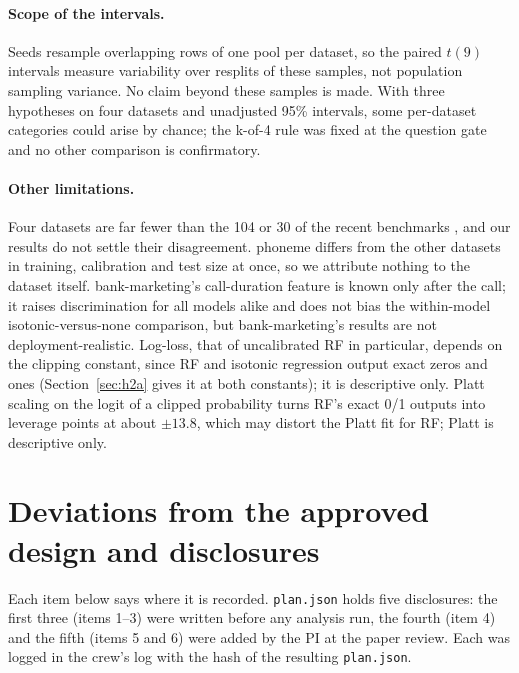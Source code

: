 \documentclass[11pt]{article}
\newcommand{\ds}[1]{\textsf{#1}}
\newcommand{\bm}{\ds{bank-marketing}}
\newcommand{\ph}{\ds{phoneme}}
\begin{document}
\paragraph{Scope of the intervals.} Seeds resample overlapping rows of one pool per dataset,
so the paired $t(9)$ intervals measure variability over resplits of these samples, not
population sampling variance. No claim beyond these samples is made. With three hypotheses
on four datasets and unadjusted 95\% intervals, some per-dataset categories could arise by
chance; the k-of-4 rule was fixed at the question gate and no other comparison is
confirmatory.

\paragraph{Other limitations.} Four datasets are far fewer than the 104 or 30 of the recent
benchmarks \citep{berta2026,manokhin2026}, and our results do not settle their disagreement.
\ph{} differs from the other datasets in training, calibration and test size at once, so we
attribute nothing to the dataset itself. \bm's call-duration feature is known only after the
call; it raises discrimination for all models alike and does not bias the within-model
isotonic-versus-none comparison, but \bm's results are not deployment-realistic. Log-loss, that
of uncalibrated RF in particular, depends on the clipping constant, since RF and isotonic
regression output exact zeros and ones (Section~\ref{sec:h2a} gives it at both constants); it
is descriptive only. Platt scaling on the logit of a
clipped probability turns RF's exact 0/1 outputs into leverage points at about $\pm13.8$, which
may distort the Platt fit for RF; Platt is descriptive only.

\section{Deviations from the approved design and disclosures}
\label{sec:deviations}

Each item below says where it is recorded. \texttt{plan.json} holds five disclosures: the
first three (items 1--3) were written before any analysis run, the fourth (item 4) and the
fifth (items 5 and 6) were added by the PI at the paper review. Each was logged in the crew's
log with the hash of the resulting \texttt{plan.json}.
\end{document}
